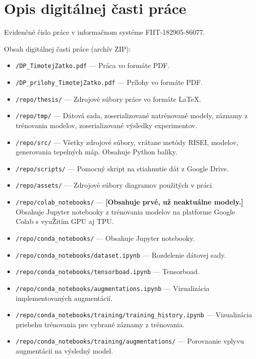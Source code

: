 \chapter{Opis digitálnej časti práce \label{cha:cdrom}}

\setcounter{page}{1}

Evidenčné čislo práce v informačnom systéme FIIT-182905-86077.

Obsah digitálnej časti práce (archív ZIP):

\begin{itemize}
    \item \texttt{/DP\_TimotejZatko.pdf} --- Práca vo formáte PDF.
    \item \texttt{/DP\_prilohy\_TimotejZatko.pdf} --- Prílohy vo formáte PDF.
    \item \texttt{/repo/thesis/} --- Zdrojové súbory práce vo formáte \LaTeX.
    \item \texttt{/repo/tmp/} --- Dátová sada, zoserializované natrénované modely, záznamy z trénovania modelov, zoserializované výsledky experimentov. 
    \item \texttt{/repo/src/} --- Všetky zdrojové súbory, vrátane metódy RISEI, modelov, generovania tepelných máp. Obsahuje Python balíky.
    \item \texttt{/repo/scripts/} --- Pomocný skript na stiahnutie dát z Google Drive.
    \item \texttt{/repo/assets/} --- Zdrojové súbory diagramov použitých v práci. 
    \item \texttt{/repo/colab\_notebooks/} --- \textbf{[Obsahuje prvé, už neaktuálne modely.]} Obsahuje Jupyter notebooky z trénovania modelov na platforme Google Colab s vyuŽitím GPU aj TPU. 
    \item \texttt{/repo/conda\_notebooks/} --- Obsahuje Jupyter notebooky.
    \item \texttt{/repo/conda\_notebooks/dataset.ipynb} --- Rozdelenie dátovej sady.
    \item \texttt{/repo/conda\_notebooks/tensorboad.ipynb} --- Tensorboad.
    \item \texttt{/repo/conda\_notebooks/augmentations.ipynb} --- Vizualizácia implementovaných augmentácií.
    \item \texttt{/repo/conda\_notebooks/training/training\_history.ipynb} --- Vizualizácia priebehu trénovania pre vybrané záznamy z trénovania.
    \item \texttt{/repo/conda\_notebooks/training/augmentations/} --- Porovnanie vplyvu augmentácií na výsledný model. 

\end{itemize}
